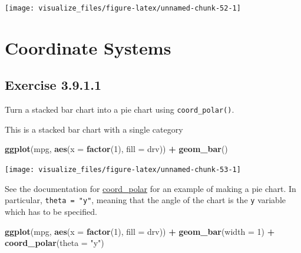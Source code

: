 \documentclass[]{book}
\newenvironment{Shaded}{\begin{snugshade}}{\end{snugshade}}
\newcommand{\DataTypeTok}[1]{\textcolor[rgb]{0.13,0.29,0.53}{#1}}
\newcommand{\DecValTok}[1]{\textcolor[rgb]{0.00,0.00,0.81}{#1}}
\newcommand{\KeywordTok}[1]{\textcolor[rgb]{0.13,0.29,0.53}{\textbf{#1}}}
\newcommand{\NormalTok}[1]{#1}
\newcommand{\OperatorTok}[1]{\textcolor[rgb]{0.81,0.36,0.00}{\textbf{#1}}}
\newcommand{\StringTok}[1]{\textcolor[rgb]{0.31,0.60,0.02}{#1}}
\theoremstyle{plain}
\theoremstyle{remark}
\begin{document}
\begin{center}\texttt{[image: visualize\_files/figure-latex/unnamed-chunk-52-1]} \end{center}

\hypertarget{coordinate-systems}{%
\section{Coordinate Systems}\label{coordinate-systems}}

\hypertarget{exercise-3.9.1.1}{%
\subsection*{\texorpdfstring{Exercise {3.9.1.1}}{Exercise 3.9.1.1}}\label{exercise-3.9.1.1}}

Turn a stacked bar chart into a pie chart using \texttt{coord\_polar()}.

This is a stacked bar chart with a single category

\begin{Shaded}
\begin{Highlighting}[]
\KeywordTok{ggplot}\NormalTok{(mpg, }\KeywordTok{aes}\NormalTok{(}\DataTypeTok{x =} \KeywordTok{factor}\NormalTok{(}\DecValTok{1}\NormalTok{), }\DataTypeTok{fill =}\NormalTok{ drv)) }\OperatorTok{+}
\StringTok{  }\KeywordTok{geom_bar}\NormalTok{()}
\end{Highlighting}
\end{Shaded}

\begin{center}\texttt{[image: visualize\_files/figure-latex/unnamed-chunk-53-1]} \end{center}

See the documentation for \href{https://ggplot2.tidyverse.org/reference/coord_polar.html}{coord\_polar} for an example of making a pie chart. In particular, \texttt{theta\ =\ "y"}, meaning that the angle of the chart is the \texttt{y} variable which has to be specified.

\begin{Shaded}
\begin{Highlighting}[]
\KeywordTok{ggplot}\NormalTok{(mpg, }\KeywordTok{aes}\NormalTok{(}\DataTypeTok{x =} \KeywordTok{factor}\NormalTok{(}\DecValTok{1}\NormalTok{), }\DataTypeTok{fill =}\NormalTok{ drv)) }\OperatorTok{+}
\StringTok{  }\KeywordTok{geom_bar}\NormalTok{(}\DataTypeTok{width =} \DecValTok{1}\NormalTok{) }\OperatorTok{+}
\StringTok{  }\KeywordTok{coord_polar}\NormalTok{(}\DataTypeTok{theta =} \StringTok{"y"}\NormalTok{)}
\end{Highlighting}
\end{Shaded}
\end{document}
